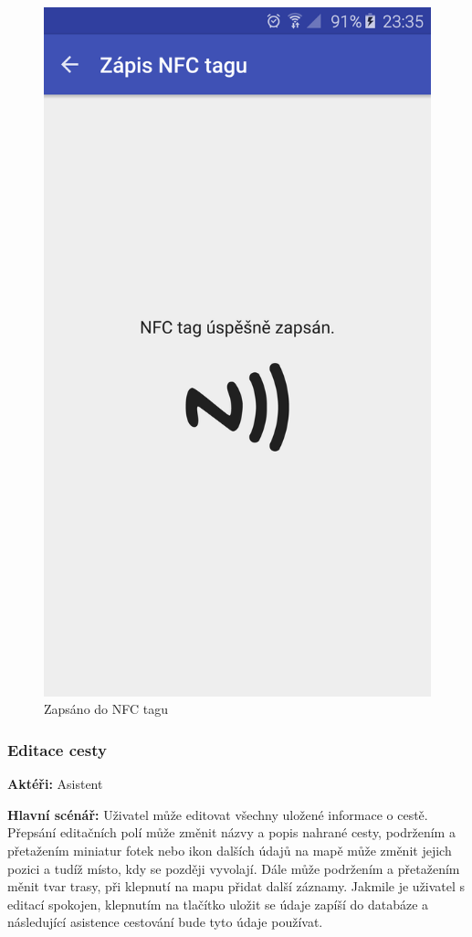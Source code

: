 \documentclass[czech,master,public,dept460,male,java,cpdeclaration]{diploma}
\newcommand{\usecase}[2]{\subsubsection{#1}\label{#2}}
\begin{document}
\begin{figure}[H]
\begin{minipage}{.5\textwidth}
                    \includegraphics[scale=0.14]{img/screen/zapisdonfc.png}
            \caption{Zapsáno do NFC tagu}
            \label{fig:nfczapsano}

       \end{minipage}
\end{figure}



\usecase{Editace cesty}{editacecesty}
\textbf{Aktéři:} Asistent

\vspace{0.1cm}
\noindent
\textbf{Hlavní scénář:} Uživatel může editovat všechny uložené informace o cestě. Přepsání editačních
polí může změnit názvy a popis nahrané cesty, podržením a přetažením miniatur fotek nebo ikon dalších údajů na mapě může změnit
jejich pozici a tudíž místo, kdy se později vyvolají. Dále může podržením a přetažením měnit tvar trasy,
při klepnutí na mapu přidat další záznamy. Jakmile je uživatel s editací spokojen, klepnutím na tlačítko
uložit se údaje zapíší do databáze a následující asistence cestování bude tyto údaje používat.
\end{document}
